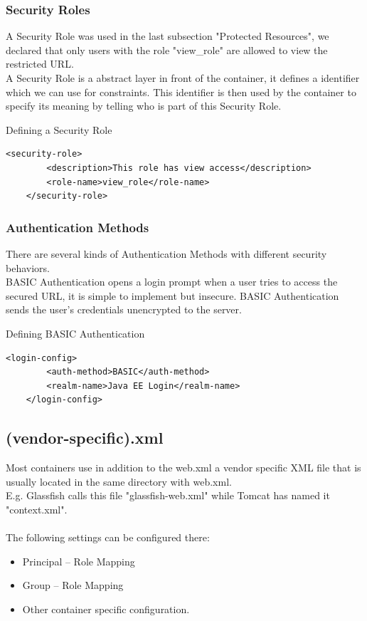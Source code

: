 \documentclass[12pt,a4paper]{report}
\begin{document}
\subsubsection*{Security Roles}
A Security Role was used in the last subsection "Protected Resources", we declared that only users with the role "view\_role" are allowed to view the restricted URL.\\
A Security Role is a abstract layer in front of the container, it defines a identifier which we can use for constraints. This identifier is then used by the container to specify its meaning by telling who is part of this Security Role.\\
\begin{bclogo}[couleur=yellow!15,arrondi=0.1,logo=\bccrayon, ombre = true]{Defining a Security Role}
\begin{lstlisting}[style=XML]
    <security-role>
	    <description>This role has view access</description>
	    <role-name>view_role</role-name>
    </security-role>
\end{lstlisting}
\end{bclogo}
\subsubsection*{Authentication Methods}
There are several kinds of Authentication Methods with different security behaviors.\\
BASIC Authentication opens a login prompt when a user tries to access the secured URL, it is simple to implement but insecure. BASIC Authentication sends the user's credentials unencrypted to the server.\\
\begin{bclogo}[couleur=yellow!15,arrondi=0.1,logo=\bccrayon, ombre = true]{Defining BASIC Authentication}
\begin{lstlisting}[style=XML]
    <login-config>
	    <auth-method>BASIC</auth-method>
	    <realm-name>Java EE Login</realm-name>
    </login-config>
\end{lstlisting}
\end{bclogo}
\newpage
\subsection{(vendor-specific).xml}
Most containers use in addition to the web.xml a vendor specific XML file that is usually located in the same directory with web.xml.\\
E.g. Glassfish calls this file "glassfish-web.xml" while Tomcat has named it "context.xml".\\\\
The following settings can be configured there:\\
\begin{itemize}
	\item Principal – Role Mapping
	\item Group – Role Mapping
	\item Other container specific configuration.
\end{itemize}
\end{document}
